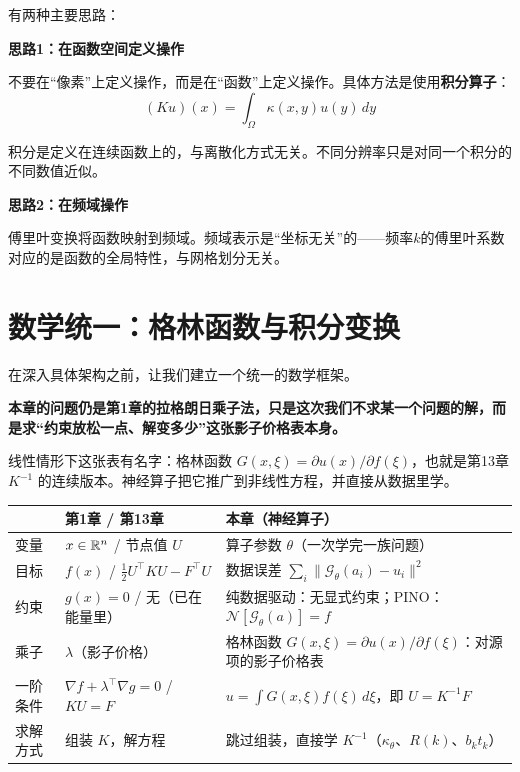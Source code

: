 有两种主要思路：

\textbf{思路1：在函数空间定义操作}

不要在“像素”上定义操作，而是在“函数”上定义操作。具体方法是使用\textbf{积分算子}：
\begin{equation}
    (Ku)(x) = \int_\Omega \kappa(x, y) u(y) \, dy
\end{equation}

积分是定义在连续函数上的，与离散化方式无关。不同分辨率只是对同一个积分的不同数值近似。

\textbf{思路2：在频域操作}

傅里叶变换将函数映射到频域。频域表示是“坐标无关”的——频率$k$的傅里叶系数对应的是函数的全局特性，与网格划分无关。

\section{数学统一：格林函数与积分变换}

在深入具体架构之前，让我们建立一个统一的数学框架。

\begin{tcolorbox}[colback=yellow!10, colframe=orange!80, title=本章的核心观点]
\textbf{本章的问题仍是第1章的拉格朗日乘子法，只是这次我们不求某一个问题的解，而是求“约束放松一点、解变多少”这张影子价格表本身。}

线性情形下这张表有名字：格林函数 $G(x, \xi) = \partial u(x)/\partial f(\xi)$，也就是第13章 $K^{-1}$ 的连续版本。神经算子把它推广到非线性方程，并直接从数据里学。

\begin{center}
\renewcommand{\arraystretch}{1.3}
\small
\begin{tabularx}{\linewidth}{l>{\raggedright\arraybackslash}p{4.2cm}>{\raggedright\arraybackslash}X}
\toprule
 & \textbf{第1章 / 第13章} & \textbf{本章（神经算子）} \\
\midrule
变量 & $x \in \mathbb{R}^n$ / 节点值 $U$ & 算子参数 $\theta$（一次学完一族问题） \\
目标 & $f(x)$ / $\frac{1}{2}U^\top KU - F^\top U$ & 数据误差 $\sum_i \|\mathcal{G}_\theta(a_i) - u_i\|^2$ \\
约束 & $g(x) = 0$ / 无（已在能量里） & 纯数据驱动：无显式约束；PINO：$\mathcal{N}[\mathcal{G}_\theta(a)] = f$ \\
乘子 & $\lambda$（影子价格） & 格林函数 $G(x, \xi) = \partial u(x)/\partial f(\xi)$：对源项的影子价格表 \\
一阶条件 & $\nabla f + \lambda^\top \nabla g = 0$ / $KU = F$ & $u = \int G(x, \xi) f(\xi)\,d\xi$，即 $U = K^{-1}F$ \\
求解方式 & 组装 $K$，解方程 & 跳过组装，直接学 $K^{-1}$（$\kappa_\theta$、$R(k)$、$b_k t_k$） \\
\bottomrule
\end{tabularx}
\end{center}
\end{tcolorbox}

